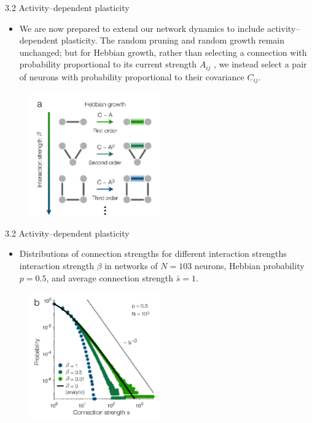 \documentclass[
  notheorems,
  aspectratio=54,
]{beamer}
\begin{document}
\begin{frame}{3.2 Activity–dependent plasticity}
  \begin{itemize}
    \item We are now prepared to extend our network dynamics to include activity–dependent plasticity. The random pruning and random growth remain unchanged;
      but for Hebbian growth, rather than selecting a connection with probability proportional to its current strength $A_{ij}$ , we instead select a pair of neurons with probability proportional to their covariance $C_{ij}$.
  \end{itemize}
  \begin{figure}
    \centering
    \includegraphics[width=0.5\textwidth]{./screenshot/8.png}
  \end{figure}
\end{frame}

\begin{frame}{3.2 Activity–dependent plasticity}
  \begin{itemize}
    \item Distributions of connection strengths for different interaction strengths interaction strength
      $\beta$ in networks of $N = 103$ neurons, Hebbian probability $p = 0.5$, and average connection strength $\bar{s} = 1$.
  \end{itemize}
  \begin{figure}
    \centering
    \includegraphics[width=0.5\textwidth]{./screenshot/9.png}
  \end{figure}
\end{frame}
\end{document}

